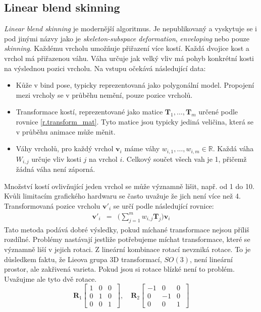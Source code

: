 \subsection{Linear blend skinning} \label{linear_blend_skinning}
\textit{Linear blend skinning} \cite{skinningMethods} je modernější algoritmus. Je nepublikovaný a vyskytuje se i pod jinými názvy jako je \textit{skeleton-subspace deformation}, \textit{enveloping} nebo pouze \textit{skinning}. Každému vrcholu umožňuje přiřazení více kostí. Každá dvojice kost a vrchol má přiřazenou váhu. Váha určuje jak velký vliv má pohyb konkrétní kosti na výslednou pozici vrcholu. Na vstupu očekává následující data: 
\begin{itemize}
\item Kůže v bind pose, typicky reprezentovaná jako polygonální model. Propojení mezi vrcholy se v průběhu nemění, pouze pozice vrcholů. 
\item Transformace kostí, reprezentované jako matice $\mathbf{T}_1,\ldots,\mathbf{T}_m$ určené podle rovnice \ref{r.transform_mat}. Tyto matice jsou typicky jediná veličina, která se v průběhu animace může měnit. 
\item \label{weight_sum} Váhy vrcholů, pro každý vrchol $\mathbf{v}_i$ máme váhy $w_{i,1},\ldots,w_{i,m} \in \mathbb{R}$. Každá váha $W_{i,j}$ určuje vliv kosti $j$ na vrchol $i$. Celkový součet všech vah je 1, přičemž žádná váha není záporná. 
\end{itemize}
Množství kostí ovlivňující jeden vrchol se může významně lišit, např. od 1 do 10. Kvůli limitacím grafického hardwaru se často uvažuje že jich není více než 4. Transformovaná pozice vrcholu $\mathbf{v}'_i$ se určí podle následující rovnice:
\begin{eqnarray}
\mathbf{v}'_i &=& \Bigg(\sum_{j=1}^mw_{i,j} \mathbf{T}_j\Bigg)\mathbf{v}_i\label{r.linear_blend_skinning}
\end{eqnarray}
 Tato metoda podává dobré výsledky, pokud míchané transformace nejsou příliš rozdílné. Problémy nastávají jestliže potřebujeme míchat transformace, které se významně liší v jejich rotaci. Z lineární kombinace rotací nevzniká rotace. To je důsledkem faktu, že Lieova grupa 3D transformací, $SO(3)$, není lineární prostor, ale zakřivená varieta. Pokud jsou si rotace blízké není to problém. Uvažujme ale tyto dvě rotace.
$$\mathbf{R}_1\left[\begin{array}{ccc}
1 & 0 & 0\\
0 & 1 & 0\\
0 & 0 & 1~\end{array}\right], \quad \mathbf{R}_2 \left[\begin{array}{ccc}
-1 & 0 & 0\\
0 & -1 & 0\\
0 & 0 & 1~\end{array}\right]$$ 
